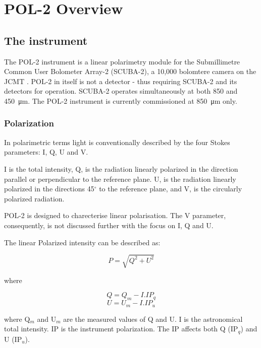 \chapter{POL-2 Overview}
\label{sec:pol2}
\section{The instrument}

The POL-2 instrument is a linear polarimetry module for the
Submillimetre Common User Bolometer Array-2 (SCUBA-2), a 10,000
bolomtere camera on the JCMT \cite{Friberg}\cite{Bastien2011}.
POL-2 in itself is not a detector - thus requiring SCUBA-2
and its detectors for operation. SCUBA-2 operates
simultaneously at both 850 and \SI{450}{\micro\metre}. The POL-2
instrument is currently commissioned at \SI{850}{\micro\metre} only.


\subsection*{Polarization}

In polarimetric terms light is conventionally 
described by the four Stokes parameters: I, Q, U and V.


I is the total intensity, Q, is the radiation linearly polarized in the
direction parallel or perpendicular to the reference plane. U, is the
radiation linearly polarized in the directions 45$^{\circ }$ to the
reference plane, and V, is the circularly polarized radiation.

POL-2 is designed to charecterise linear polarisation. 
The V parameter, consequently, is not discussed further
with the focus on I, Q and U.

The linear Polarized intensity can be described as:

\begin{equation}
P = \sqrt{Q^{2}+U^{2}}
\end{equation}

where

\begin{equation}
Q = Q_{m} - I . IP_{q}
\end{equation}
\begin{equation}
U = U_{m} - I . IP_{u}
\end{equation}

where Q$_{m}$ and U$_{m}$ are the measured values of Q and U.
I is the astronomical total intensity.
IP is the instrument polarization. The IP affects both Q
(IP$_{q}$) and U (IP$_{u}$).


